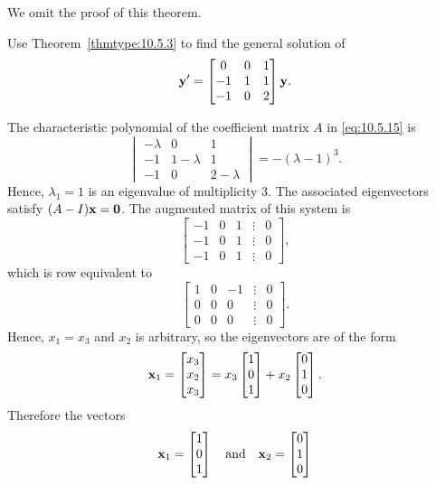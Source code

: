 \documentclass{ximera}
\begin{document}
We omit the proof of this theorem.

\begin{example}\label{example:10.5.5}
Use Theorem~\ref{thmtype:10.5.3} to find the general solution of
\begin{equation}\label{eq:10.5.15}
{\bf y}'=\begin{bmatrix}0&0&1\\-1&1&1\\-1&0&2\end{bmatrix}{\bf y}.
\end{equation}


\begin{explanation}  The characteristic polynomial of
the coefficient matrix $A$ in  \eqref{eq:10.5.15} is
$$
\begin{vmatrix}-\lambda & 0 & 1\\ -1 & 1-\lambda &
1\\ -1 & 0 & 2-\lambda\end{vmatrix}=-(\lambda-1)^3.
$$
Hence,  $\lambda_1=1$ is
an eigenvalue of multiplicity $3$.  The associated eigenvectors
satisfy $(A-I){\bf x=0}$. The  augmented
matrix of this system is
$$
\begin{bmatrix} -1 & 0 & 1 &\vdots & 0\\
-1& 0 & 1 &\vdots & 0\\ -1 & 0 & 1 &
\vdots & 0\end{bmatrix},
 $$
which is row equivalent to
$$
\begin{bmatrix} 1 & 0 &- 1 &\vdots& 0\\ 0 & 0 & 0  &\vdots& 0
\\ 0 & 0 & 0 &\vdots&0\end{bmatrix}.
$$
Hence, $x_1 =x_3$ and  $x_2$ is arbitrary, so the eigenvectors are  of
the form
$$
{\bf x}_1=\begin{bmatrix}x_3\\x_2\\x_3\end{bmatrix}=x_3\begin{bmatrix}1\\0\\1\end{bmatrix}+x_2\begin{bmatrix}0\\1\\0\end{bmatrix}.
$$
Therefore the vectors
\begin{equation}\label{eq:10.5.16}
{\bf x}_1  =\begin{bmatrix}1\\0\\1\end{bmatrix}\quad\mbox{and}\quad {\bf x}_2=\begin{bmatrix}0\\1\\0\end{bmatrix}

\end{equation}
\end{explanation}
\end{example}
\end{document}
